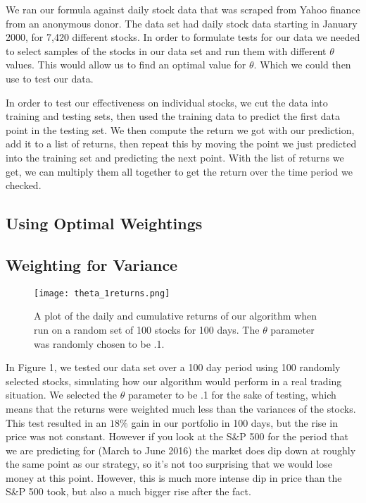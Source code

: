\documentclass{article}
\begin{document}
We ran our formula against daily stock data that was scraped from Yahoo finance from an anonymous donor.  The data set had daily stock data starting in January 2000, for 7,420 different stocks.  In order to formulate tests for our data we needed to select samples of the stocks in our data set and run them with different $\theta$ values.  This would allow us to find an optimal value for $\theta$. Which we could then use to test our data.  

In order to test our effectiveness on individual stocks, we cut the data into training and testing sets, then used the training data to predict the first data point in the testing set. We then compute the return we got with our prediction, add it to a list of returns, then repeat this by moving the point we just predicted into the training set and predicting the next point.  With the list of returns we get, we can multiply them all together to get the return over the time period we checked.


\subsection{Using Optimal Weightings}

\subsection{Weighting for Variance}

\begin{figure}[H]
  \texttt{[image: theta\_1returns.png]}
  \caption{A plot of the daily and cumulative returns of our algorithm when run on a random set of 100 stocks for 100 days.  The $\theta$ parameter was randomly chosen to be .1.}
\end{figure}
In Figure 1, we tested our data set over a 100 day period using 100 randomly selected stocks, simulating how our algorithm would perform in a real trading situation.  We selected the $\theta$ parameter to be .1 for the sake of testing, which means that the returns were weighted much less than the variances of the stocks.  This test resulted in an $18\%$ gain in our portfolio in 100 days, but the rise in price was not constant.  However if you look at the S\&P 500 for the period that we are predicting for (March to June 2016) the market does dip down at roughly the same point as our strategy, so it's not too surprising that we would lose money at this point. However, this is much more intense dip in price than the S\&P 500 took, but also a much bigger rise after the fact.
\end{document}
